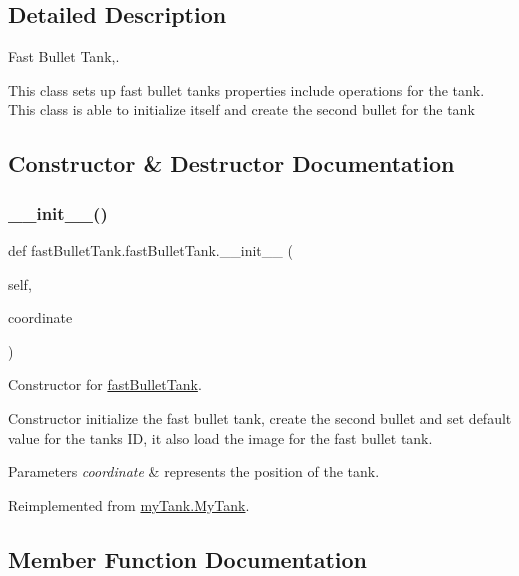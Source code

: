\subsection{Detailed Description}
Fast Bullet Tank,. 

This class sets up fast bullet tank\textquotesingle{}s properties include operations for the tank. This class is able to initialize itself and create the second bullet for the tank 

\subsection{Constructor \& Destructor Documentation}
\mbox{\label{classfast_bullet_tank_1_1fast_bullet_tank_a7e2b91d0e75f219ffeea3f099c37961e}} 
\subsubsection{\texorpdfstring{\_\_init\_\_()}{\_\_init\_\_()}}
{\footnotesize\ttfamily def fast\+Bullet\+Tank.\+fast\+Bullet\+Tank.\+\_\+\+\_\+init\+\_\+\+\_\+ (\begin{DoxyParamCaption}\item[{}]{self,  }\item[{}]{coordinate }\end{DoxyParamCaption})}



Constructor for \mbox{\hyperlink{classfast_bullet_tank_1_1fast_bullet_tank}{fast\+Bullet\+Tank}}. 

Constructor initialize the fast bullet tank, create the second bullet and set default value for the tank\textquotesingle{}s ID, it also load the image for the fast bullet tank. 
\begin{DoxyParams}{Parameters}
{\em coordinate} & represents the position of the tank. \\
\hline
\end{DoxyParams}


Reimplemented from \mbox{\hyperlink{classmy_tank_1_1_my_tank_a5a2b6c586c454d3801f6701a6befb7e5}{my\+Tank.\+My\+Tank}}.



\subsection{Member Function Documentation}
\mbox{\label{classfast_bullet_tank_1_1fast_bullet_tank_af9637570833b43e84e999cfc3ca41e20}} 
